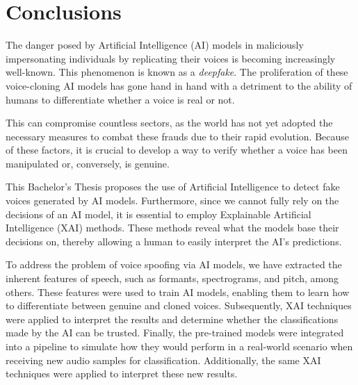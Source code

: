 

\chapter*{Conclusions}
\label{chap:conclusiones}


The danger posed by Artificial Intelligence (AI) models in maliciously impersonating individuals by replicating their voices is becoming increasingly well-known. This phenomenon is known as a \textit{deepfake}. The proliferation of these voice-cloning AI models has gone hand in hand with a detriment to the ability of humans to differentiate whether a voice is real or not.

This can compromise countless sectors, as the world has not yet adopted the necessary measures to combat these frauds due to their rapid evolution. Because of these factors, it is crucial to develop a way to verify whether a voice has been manipulated or, conversely, is genuine. 

This Bachelor's Thesis proposes the use of Artificial Intelligence to detect fake voices generated by AI models. Furthermore, since we cannot fully rely on the decisions of an AI model, it is essential to employ Explainable Artificial Intelligence (XAI) methods. These methods reveal what the models base their decisions on, thereby allowing a human to easily interpret the AI's predictions.


To address the problem of voice spoofing via AI models, we have extracted the inherent features of speech, such as formants, spectrograms, and pitch, among others. These features were used to train AI models, enabling them to learn how to differentiate between genuine and cloned voices. Subsequently, XAI techniques were applied to interpret the results and determine whether the classifications made by the AI can be trusted. Finally, the pre-trained models were integrated into a pipeline to simulate how they would perform in a real-world scenario when receiving new audio samples for classification. Additionally, the same XAI techniques were applied to interpret these new results.


